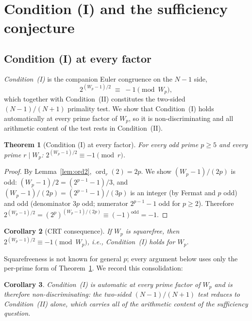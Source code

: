 \documentclass[11pt]{amsart}
\theoremstyle{plain}
\newtheorem{theorem}{Theorem}[section]
\newtheorem{corollary}[theorem]{Corollary}
\theoremstyle{definition}
\theoremstyle{remark}
\numberwithin{equation}{section}
\newcommand{\ord}{\operatorname{ord}}
\begin{document}
\section{Condition (I) and the sufficiency conjecture}

\subsection{Condition (I) at every factor}

\emph{Condition~(I)} is the companion Euler congruence on the $N - 1$ side,
\[
  2^{(W_p - 1)/2} \;\equiv\; -1 \pmod{W_p},
\]
which together with Condition~(II) constitutes the two-sided $(N-1)/(N+1)$ primality test. We show that Condition~(I) holds automatically at every prime factor of $W_p$, so it is non-discriminating and all arithmetic content of the test rests in Condition~(II).

\begin{theorem}[Condition (I) at every factor]\label{thm:condI}
For every odd prime $p \geq 5$ and every prime $r \mid W_p$: $2^{(W_p - 1)/2} \equiv -1 \pmod r$.
\end{theorem}

\begin{proof}
By Lemma~\ref{lem:ord2}, $\ord_r(2) = 2p$. We show $(W_p - 1)/(2p)$ is odd: $(W_p - 1)/2 = (2^{p-1} - 1)/3$, and $(W_p - 1)/(2p) = (2^{p-1} - 1)/(3 p)$ is an integer (by Fermat and $p$ odd) and odd (denominator $3p$ odd; numerator $2^{p-1} - 1$ odd for $p \geq 2$). Therefore $2^{(W_p - 1)/2} = (2^p)^{(W_p - 1)/(2p)} \equiv (-1)^{\text{odd}} = -1$.
\end{proof}

\begin{corollary}[CRT consequence]\label{cor:condI-crt}
If $W_p$ is squarefree, then $2^{(W_p - 1)/2} \equiv -1 \pmod{W_p}$, i.e., Condition~(I) holds for $W_p$.
\end{corollary}

Squarefreeness is not known for general $p$; every argument below uses only the per-prime form of Theorem~\ref{thm:condI}. We record this consolidation:

\begin{corollary}\label{cor:condI-equiv}
Condition~(I) is automatic at every prime factor of $W_p$ and is therefore non-discriminating: the two-sided $(N-1)/(N+1)$ test reduces to Condition~(II) alone, which carries all of the arithmetic content of the sufficiency question.
\end{corollary}
\end{document}
